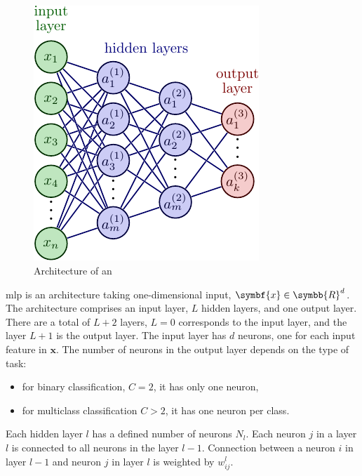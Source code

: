 \documentclass[../main.tex]{subfiles}
\begin{document}
	\subsection{}\label{subsec:mlp}
		\begin{figure}
			\vspace{-1\intextsep}
			\centering
			\includegraphics{mlp.pdf}
			\caption{Architecture of an }\label{fig:mlp}
		\end{figure}
		\Gls{mlp} is an architecture taking one-dimensional input, \(\symbf{x} \in \symbb{R}^d\).
		The architecture comprises an input layer, \(L\) hidden layers, and one output layer.
		There are a total of \(L+2\) layers, \(L=0\) corresponds to the input layer, and the layer \(L+1\) is the output layer.
		The input layer has \(d\) neurons, one for each input feature in \(\symbf{x}\).
		The number of neurons in the output layer depends on the type of task:
		\begin{itemize}[nosep, topsep=-5pt]
			\item for binary classification, \(C=2\), it has only one neuron,
			\item for multiclass classification \(C > 2 \), it has one neuron per class.
		\end{itemize}
		Each hidden layer \(l\) has a defined number of neurons \(N_{l}\).
		Each neuron \(j\) in a layer \(l\) is connected to all neurons in the layer \(l-1\).
		Connection between a neuron \(i\) in layer \(l-1\) and neuron \(j\) in layer \(l\) is weighted by \(w^{l}_{ij}\).
\end{document}
